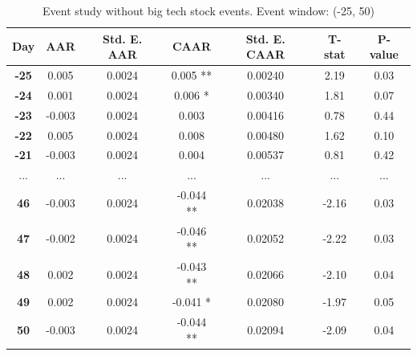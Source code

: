 
\begin{table}[h]
    \centering
    \caption{Event study without big tech stock events. Event window: (-25, 50)}
    \label{tab:esNoBigTechLong}
    \begin{tabular}{|c|c|c|c|c|c|c|}
        \hline
        \textbf{Day} & \textbf{AAR} & \textbf{Std. E. AAR} & \textbf{CAAR} & \textbf{Std. E. CAAR} & \textbf{T-stat} & \textbf{P-value} \\
        \hline
        \textbf{-25} & 0.005 & 0.0024 & 0.005 ** & 0.00240 & 2.19 & 0.03 \\
        \hline
        \textbf{-24} & 0.001 & 0.0024 & 0.006 * & 0.00340 & 1.81 & 0.07 \\
        \hline
        \textbf{-23} & -0.003 & 0.0024 & 0.003 & 0.00416 & 0.78 & 0.44 \\
        \hline
        \textbf{-22} & 0.005 & 0.0024 & 0.008 & 0.00480 & 1.62 & 0.10 \\
        \hline
        \textbf{-21} & -0.003 & 0.0024 & 0.004 & 0.00537 & 0.81 & 0.42 \\
        \hline
        ... & ... & ... & ... & ... & ... & ... \\
        \hline
        \textbf{46} & -0.003 & 0.0024 & -0.044 ** & 0.02038 & -2.16 & 0.03 \\
        \hline
        \textbf{47} & -0.002 & 0.0024 & -0.046 ** & 0.02052 & -2.22 & 0.03 \\
        \hline
        \textbf{48} & 0.002 & 0.0024 & -0.043 ** & 0.02066 & -2.10 & 0.04 \\
        \hline
        \textbf{49} & 0.002 & 0.0024 & -0.041 * & 0.02080 & -1.97 & 0.05 \\
        \hline
        \textbf{50} & -0.003 & 0.0024 & -0.044 ** & 0.02094 & -2.09 & 0.04 \\
        \hline
    \end{tabular}
\end{table}




